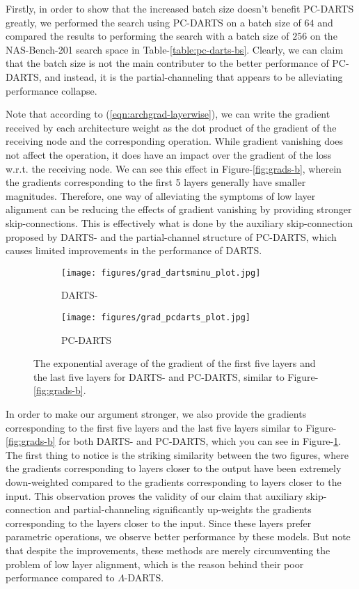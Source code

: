 \documentclass{article} \usepackage{fancyhdr, iclr2023_conference, times}
\newcommand{\mydarts}{$\Lambda$-DARTS\xspace}
\newcommand{\lambdafn}{layer alignment\xspace}
\begin{document}
Firstly, in order to show that the increased batch size doesn't benefit PC-DARTS greatly, we performed the search using PC-DARTS on a batch size of $64$ and compared the results to performing the search with a batch size of $256$ on the NAS-Bench-201 search space in Table-\ref{table:pc-darts-bs}. Clearly, we can claim that the batch size is not the main contributer to the better performance of PC-DARTS, and instead, it is the partial-channeling that appears to be alleviating performance collapse.
\par Note that according to (\ref{eqn:archgrad-layerwise}), we can write the gradient received by each architecture weight as the dot product of the gradient of the receiving node and the corresponding operation. While gradient vanishing does not affect the operation, it does have an impact over the gradient of the loss w.r.t. the receiving node. We can see this effect in Figure-\ref{fig:grads-b}, wherein the gradients corresponding to the first 5 layers generally have smaller magnitudes. Therefore, one way of alleviating the symptoms of low \lambdafn can be reducing the effects of gradient vanishing by providing stronger skip-connections. This is effectively what is done by the auxiliary skip-connection proposed by DARTS- and the partial-channel structure of PC-DARTS, which causes limited improvements in the performance of DARTS.
\par \begin{figure}[t]
    \centering
    \begin{subfigure}[h]{0.5\textwidth}
        \centering
        \texttt{[image: figures/grad\_dartsminu\_plot.jpg]}
        \caption{DARTS-}
    \end{subfigure}\begin{subfigure}[h]{0.5\textwidth}
        \centering
        \texttt{[image: figures/grad\_pcdarts\_plot.jpg]}
        \caption{PC-DARTS}
    \end{subfigure}
    \caption{The exponential average of the gradient of the first five layers and the last five layers for DARTS- and PC-DARTS, similar to Figure-\ref{fig:grads-b}.}
    \label{fig:grads-dartsmin-pcdarts}
\end{figure}In order to make our argument stronger, we also provide the gradients corresponding to the first five layers and the last five layers similar to Figure-\ref{fig:grads-b} for both DARTS- and PC-DARTS, which you can see in Figure-\ref{fig:grads-dartsmin-pcdarts}. The first thing to notice is the striking similarity between the two figures, where the gradients corresponding to layers closer to the output have been extremely down-weighted compared to the gradients corresponding to layers closer to the input. This observation proves the validity of our claim that auxiliary skip-connection and partial-channeling significantly up-weights the gradients corresponding to the layers closer to the input. Since these layers prefer parametric operations, we observe better performance by these models. But note that despite the improvements, these methods are merely circumventing the problem of low \lambdafn, which is the reason behind their poor performance compared to \mydarts.
\end{document}

